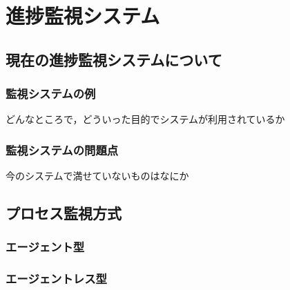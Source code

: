 \chapter{進捗監視システム}

\section{現在の進捗監視システムについて}

\subsection{監視システムの例}
どんなところで，どういった目的でシステムが利用されているか

\subsection{監視システムの問題点}
今のシステムで満せていないものはなにか

\section{プロセス監視方式}

\subsection{エージェント型}

\subsection{エージェントレス型}



